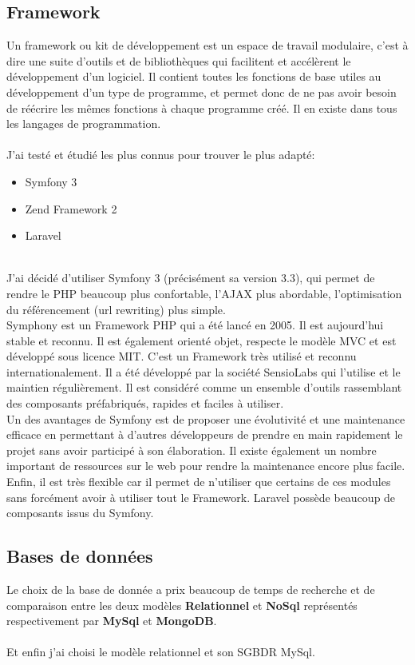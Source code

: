 \documentclass[12pt]{article}
\begin{document}
\subsection{Framework }
Un framework ou kit de développement est un espace de travail modulaire, c'est à dire
une suite d'outils et de bibliothèques qui facilitent et accélèrent le développement d'un
logiciel. Il contient toutes les fonctions de base utiles au développement d'un type de
programme, et permet donc de ne pas avoir besoin de réécrire les mêmes fonctions à
chaque programme créé. Il en existe dans tous les langages de programmation.\\ \\
J'ai testé et étudié les plus connus pour trouver le plus adapté:
\begin{itemize}
\item Symfony 3
\item Zend Framework 2
\item Laravel
\end{itemize} \\

 J'ai décidé d'utiliser Symfony 3 (précisément sa version 3.3), qui permet de  rendre le PHP beaucoup plus
confortable, l'AJAX plus abordable, l'optimisation du référencement (url rewriting) plus
simple.\\
Symphony est un Framework PHP qui a été lancé en 2005. Il est aujourd’hui stable et reconnu.
Il est également orienté objet, respecte le modèle MVC et est développé sous licence MIT.
C’est un Framework très utilisé et reconnu internationalement. Il a été développé par la société
SensioLabs qui l’utilise et le maintien régulièrement.
Il est considéré comme un ensemble d’outils rassemblant des composants préfabriqués,
rapides et faciles à utiliser.\\
Un des avantages de Symfony est de proposer une évolutivité et une maintenance efficace en
permettant à d’autres développeurs de prendre en main rapidement le projet sans avoir
participé à son élaboration. Il existe également un nombre important de ressources sur le web
pour rendre la maintenance encore plus facile. Enfin, il est très flexible car il permet de n’utiliser
que certains de ces modules sans forcément avoir à utiliser tout le Framework. Laravel
possède beaucoup de composants issus du Symfony.


\subsection{Bases de données}
 Le choix de la base de donnée  a prix beaucoup de temps de recherche et de comparaison entre les deux modèles
  \textbf{Relationnel} et \textbf{NoSql} représentés respectivement par \textbf{MySql} et \textbf{MongoDB}.\\
   \\
Et enfin j'ai choisi le modèle relationnel et son SGBDR MySql.\\
\end{document}
